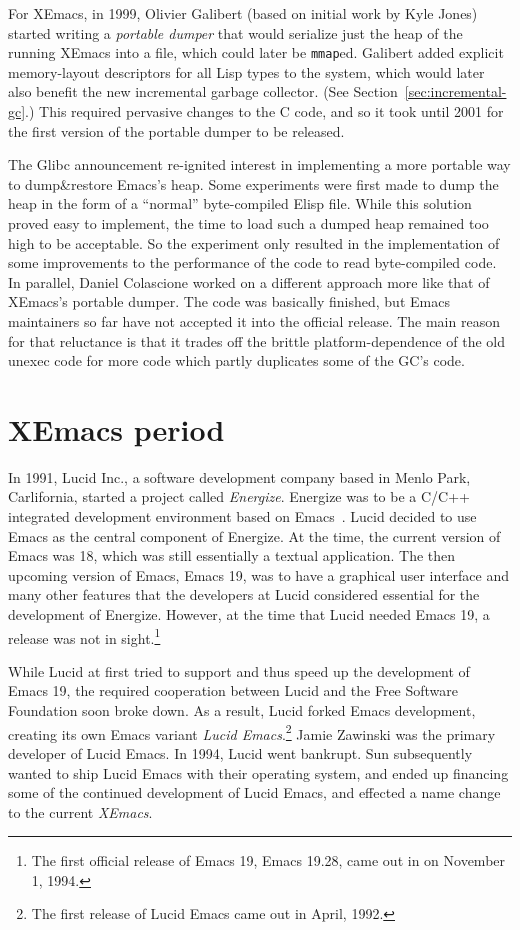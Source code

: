 \documentclass[format=acmsmall, review=false, screen=true]{acmart}
\newcommand \Elisp {Elisp}
\begin{document}
For XEmacs, in 1999, Olivier Galibert (based on initial work by Kyle
Jones) started writing a \emph{portable dumper} that would serialize
just the heap of the running XEmacs into a file, which could later be
\texttt{mmap}ed.  Galibert added explicit memory-layout descriptors
for all Lisp types to the system, which would later also benefit the
new incremental garbage collector.  (See
Section~\ref{sec:incremental-gc}.)  This required pervasive changes to
the C code, and so it took until 2001 for the first version of the
portable dumper to be released.

The Glibc announcement re-ignited interest in implementing a more portable
way to dump\&restore Emacs's heap.  Some experiments were first made to dump
the heap in the form of a ``normal'' byte-compiled \Elisp{} file.
While this solution proved easy to implement, the time to load such a dumped
heap remained too high to be acceptable.  So the experiment only resulted in
the implementation of some improvements to the performance of the code to
read byte-compiled code.  In parallel, Daniel Colascione worked on
a different approach more like that of XEmacs's portable dumper.  The code
was basically finished, but Emacs maintainers so far have not accepted it
into the official release.  The main reason for that reluctance is that it
trades off the brittle platform-dependence of the old unexec code for more
code which partly duplicates some of the GC's code.

\section{XEmacs period}         %
\label{sec:xemacs}
  
In 1991, Lucid Inc., a software development company based in Menlo
Park, Carlifornia, started a project called \emph{Energize}.
Energize was to be a C/C++ integrated development environment based on
Emacs~\cite{GabrielLetter}.  Lucid decided to use Emacs as the central
component of Energize.  At the time, the current version of Emacs was
18, which was still essentially a textual application.  The then
upcoming version of Emacs, Emacs 19, was to have a graphical user
interface and many other features that the developers at Lucid
considered essential for the development of Energize.  However, at the
time that Lucid needed Emacs 19, a release was not in
sight.\footnote{The first official release of Emacs 19, Emacs
  19.28, came out in on November 1, 1994.}

While Lucid at first tried to support and thus speed up the
development of Emacs 19, the required cooperation between Lucid and
the Free Software Foundation soon broke down.  As a result, Lucid
forked Emacs development, creating its own Emacs variant \emph{Lucid
Emacs}.\footnote{The first release of Lucid Emacs came out in April,
1992.}  Jamie Zawinski was the primary developer of Lucid Emacs.
In 1994, Lucid went bankrupt.  Sun subsequently wanted to ship
Lucid Emacs with their operating system, and ended up financing some
of the continued development of Lucid Emacs, and effected a name
change to the current \emph{XEmacs}.
\end{document}

